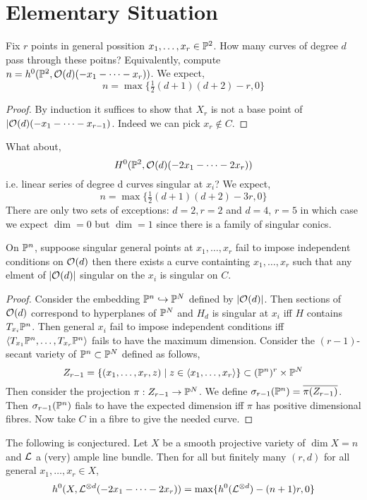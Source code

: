 \documentclass[12pt]{article}
\begin{document}
\section{Elementary Situation}

Fix $r$ points in general possition $x_1, \dots, x_r \in \P^2$. How many curves of degree $d$ pass through these poitns? Equivalently, compute $n = h^0(\P^2, \struct{}(d)(-x_1 - \cdots - x_r))$. We expect,
\[ n = \max \{ \tfrac{1}{2} (d + 1)(d + 2) - r, 0 \} \]
\begin{proof}
By induction it suffices to show that $X_r$ is not a base point of $|\struct{}(d)(-x_1 - \cdots - x_{r-1})$. Indeed we can pick $x_r \notin C$. 
\end{proof}

What about,
\[ H^0(\P^2, \struct{}(d)(-2 x_1 - \cdots - 2 x_r)) \]
i.e. linear series of degree d curves singular at $x_i$? We expect,
\[ n = \max \{ \tfrac{1}{2} (d + 1)(d + 2) - 3 r, 0 \} \]
There are only two sets of exceptions: $d = 2, r = 2$ and $d = 4$, $r = 5$ in which case we expect $\dim = 0$ but $\dim = 1$ since there is a family of singular conics.

\begin{lemma}
On $\P^n$, suppoose singular general points at $x_1, \dots, x_r$ fail to impose independent conditions on $\struct{}(d)$ then there exists a curve containting $x_1, \dots, x_r$ such that any elment of $| \struct{}(d)|$ singular on the $x_i$ is singular on $C$.
\end{lemma}

\begin{proof}
Consider the embedding $\P^n \embed \P^N$ defined by $| \struct{}(d)|$. Then sections of $\struct{}(d)$ correspond to hyperplanes of $\P^N$ and $H_d$ is singular at $x_i$ iff $H$ contains $T_{x_i} \P^n$. Then general $x_i$ fail to impose independent conditions iff $\left< T_{x_1} \P^n, \dots, T_{x_r} \P^n \right>$ fails to have the maximum dimension. Consider the $(r-1)$-secant variety of $\P^n \subset \P^N$ defined as follows,
\[ Z_{r-1} = \{ (x_1, \dots, x_r, z) \mid z \in \left< x_1, \dots, x_r \right> \} \subset (\P^n)^r \times \P^N \]
Then consider the projection $\pi : Z_{r - 1} \to \P^N$. We define $\sigma_{r - 1}(\P^n) = \overline{\pi(Z_{r-1})}$. Then $\sigma_{r - 1}(\P^n)$ fials to have the expected dimension iff $\pi$ has positive dimensional fibres. Now take $C$ in a fibre to give the needed curve. 
\end{proof}

\begin{rmk}
The following is conjectured. Let $X$ be a smooth projective variety of $\dim{X} = n$ and $\L$ a (very) ample line bundle. Then for all but finitely many $(r, d)$ for all general $x_1, \dots, x_r \in X$,
\[ h^0(X, \L^{\otimes d}(-2 x_1 - \cdots - 2 x_r)) = \max \{ h^0(\L^{\otimes d}) - (n + 1) r , 0 \} \]
\end{rmk}
\end{document}
